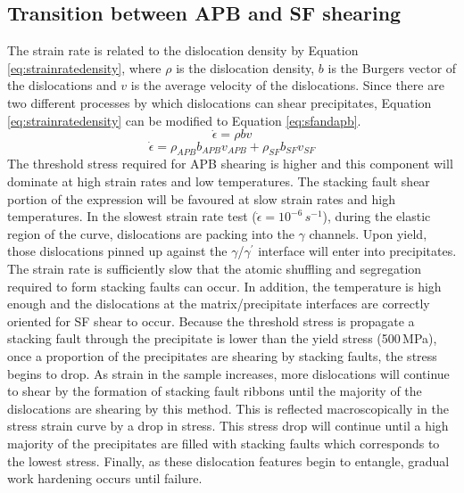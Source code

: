 \documentclass[a4paper,12pt,times,numbered,print,index]{Classes/PhDThesisPSnPDF}
\begin{document}
\subsection*{Transition between APB and SF shearing}
The strain rate is related to the dislocation density by Equation \ref{eq:strainratedensity}, where $\rho$ is the dislocation density, $b$ is the Burgers vector of the dislocations and $v$ is the average velocity of the dislocations. Since there are two different processes by which dislocations can shear precipitates, Equation \ref{eq:strainratedensity} can be modified to Equation \ref{eq:sfandapb}.
\begin{equation}
\dot{\epsilon}=\rho bv
\label{eq:strainratedensity}
\end{equation}
\begin{equation}
\dot{\epsilon}=\rho_{APB}b_{APB}v_{APB} + \rho_{SF}b_{SF}v_{SF}
\label{eq:sfandapb}
\end{equation}
The threshold stress required for APB shearing is higher and this component will dominate at high strain rates and low temperatures. The stacking fault shear portion of the expression will be favoured at slow strain rates and high temperatures. In the slowest strain rate test ($\dot{\epsilon}=10^{-6}\,s^{-1}$), during the elastic region of the curve, dislocations are packing into the $\gamma$ channels. Upon yield, those dislocations pinned up against the $\gamma$/$\gamma^\prime$ interface will enter into precipitates. The strain rate is sufficiently slow that the atomic shuffling and segregation required to form stacking faults can occur. In addition, the temperature is high enough and the dislocations at the matrix/precipitate interfaces are correctly oriented for SF shear to occur. Because the threshold stress is propagate a stacking fault through the precipitate is lower than the yield stress (500\,MPa)\cite{}, once a proportion of the precipitates are shearing by stacking faults, the stress begins to drop. As strain in the sample increases, more dislocations will continue to shear by the formation of stacking fault ribbons until the majority of the dislocations are shearing by this method. This is reflected macroscopically in the stress strain curve by a drop in stress. This stress drop will continue until a high majority of the precipitates are filled with stacking faults which corresponds to the lowest stress. Finally, as these dislocation features begin to entangle, gradual work hardening occurs until failure.\\
\end{document}

